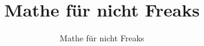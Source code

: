 \documentclass[a4paper]{book} %
\begin{document}
\author{Mathe für nicht Freaks}
\title{Mathe für nicht Freaks}

\maketitle


%

%


\end{document}
